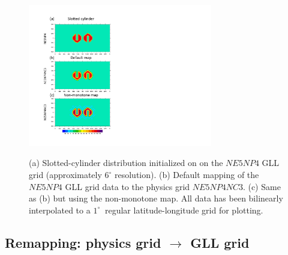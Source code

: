 \documentclass[twocol]{ametsoc}
\begin{document}
\begin{figure}[t]
\noindent\includegraphics[width=19pc,angle=0]{figs/idealized-mapping-tests-slotted-cylinder.pdf}\\
  \caption{(a) Slotted-cylinder distribution initialized on on the $NE5NP4$ GLL grid (approximately $6^\circ$ resolution). (b) Default mapping of the $NE5NP4$ GLL grid data to the physics grid $NE5NP4NC3$. (c) Same as (b) but using the non-monotone map. All data has been bilinearly interpolated to a $1^\circ\
$ regular latitude-longitude grid for plotting.}\label{fig:remap-slotted-cylinder}
\end{figure}





\subsection{Remapping: physics grid $\rightarrow$ GLL grid}
\end{document}
